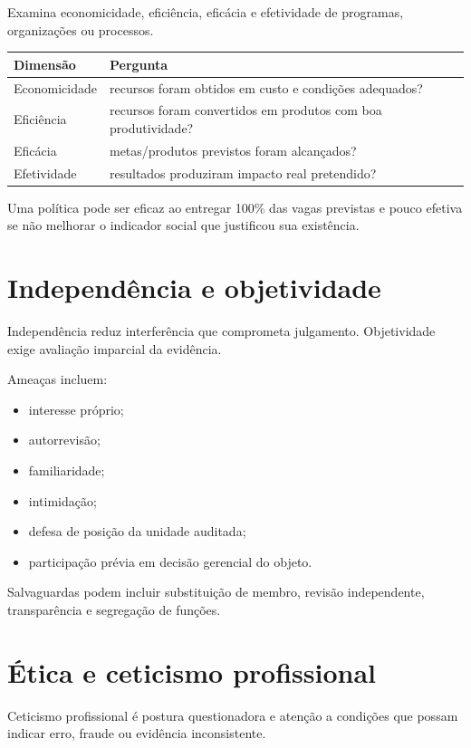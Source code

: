 Examina economicidade, eficiência, eficácia e efetividade de programas, organizações ou processos.

\begin{table}[ht]
\centering
\small
\begin{tabularx}{\textwidth}{l X}
\toprule
Dimensão & Pergunta \\
\midrule
Economicidade & recursos foram obtidos em custo e condições adequados? \\
Eficiência & recursos foram convertidos em produtos com boa produtividade? \\
Eficácia & metas/produtos previstos foram alcançados? \\
Efetividade & resultados produziram impacto real pretendido? \\
\bottomrule
\end{tabularx}
\end{table}

Uma política pode ser eficaz ao entregar 100\% das vagas previstas e pouco efetiva se não melhorar o indicador social que justificou sua existência.

\section{Independência e objetividade}

Independência reduz interferência que comprometa julgamento. Objetividade exige avaliação imparcial da evidência.

Ameaças incluem:
\begin{itemize}
\item interesse próprio;
\item autorrevisão;
\item familiaridade;
\item intimidação;
\item defesa de posição da unidade auditada;
\item participação prévia em decisão gerencial do objeto.
\end{itemize}

Salvaguardas podem incluir substituição de membro, revisão independente, transparência e segregação de funções.

\section{Ética e ceticismo profissional}

Ceticismo profissional é postura questionadora e atenção a condições que possam indicar erro, fraude ou evidência inconsistente.

